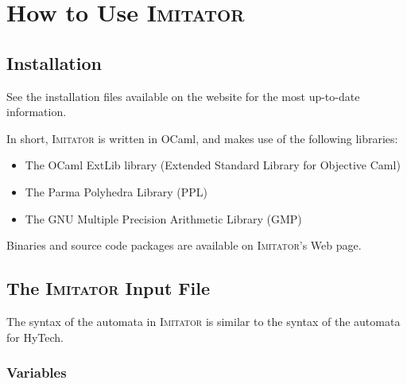 \documentclass[a4paper,10pt]{article}
\newcommand{\hytech}{{\sc HyTech}}
\newcommand{\imitator}{\textsc{Imitator}}
\newcommand{\ocaml}{OCaml}
\begin{document}
\section{How to Use \imitator{}} \label{sec:how}

\subsection{Installation}

See the installation files available on the website for the most up-to-date information.

In short, \imitator{} is written in \ocaml{}, and makes use of the following libraries:

\begin{itemize}
	\item The OCaml ExtLib library (Extended Standard Library for Objective Caml)
	\item The Parma Polyhedra Library (PPL)~\cite{bhz08}
        \item The GNU Multiple Precision Arithmetic Library (GMP)
\end{itemize}

Binaries and source code packages are available on \imitator{}'s Web page.



\subsection{The \imitator{} Input File}

The syntax of the automata in \imitator{} is similar to the syntax of the automata for \hytech{}.


\subsubsection{Variables}
\end{document}
